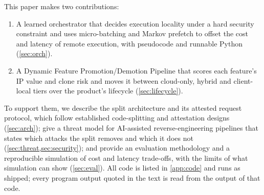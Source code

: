 This paper makes two contributions:
\begin{enumerate}
  \item A learned orchestrator that decides execution locality under a hard security
        constraint and uses micro-batching and Markov prefetch to offset the cost and
        latency of remote execution, with pseudocode and runnable Python
        (\cref{sec:orch}).
  \item A Dynamic Feature Promotion/Demotion Pipeline that scores each feature's IP value
        and clone risk and moves it between cloud-only, hybrid and client-local tiers over
        the product's lifecycle (\cref{sec:lifecycle}).
\end{enumerate}
To support them, we describe the split architecture and its attested request protocol,
which follow established code-splitting and attestation designs (\cref{sec:arch}); give a
threat model for AI-assisted reverse-engineering pipelines that states which attacks the
split removes and which it does not (\cref{sec:threat,sec:security}); and provide an
evaluation methodology and a reproducible simulation of cost and latency trade-offs, with
the limits of what simulation can show (\cref{sec:eval}).
All code is listed in \cref{app:code} and runs as shipped; every program output quoted in
the text is read from the output of that code.
